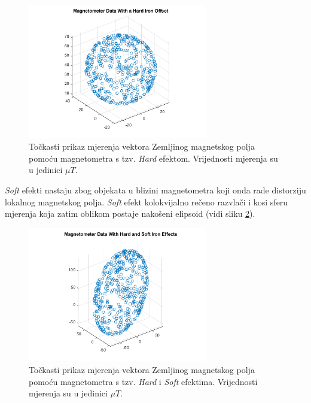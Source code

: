 \documentclass[times, utf8, diplomski, numeric]{templates/template}
\begin{document}
{{{{                \begin{figure}[htb]
                \centering
                \includegraphics[width=0.7\textwidth]{images/mag_hard.png}
                \caption{Točkasti prikaz mjerenja vektora Zemljinog magnetskog polja pomoću magnetometra s tzv. \emph{Hard} efektom. Vrijednosti mjerenja su u jedinici $\mu T$.}
                \label{fig:mag_hard}
                \end{figure}

                \emph{Soft} efekti nastaju zbog objekata u blizini magnetometra koji onda rade distorziju lokalnog magnetskog polja. \emph{Soft} efekt kolokvijalno rečeno razvlači i kosi sferu mjerenja koja zatim oblikom postaje nakošeni elipsoid (vidi sliku \ref{fig:mag_hard_soft}).

                \begin{figure}[htb]
                \centering
                \includegraphics[width=0.7\textwidth]{images/mag_hard_soft.png}
                \caption{Točkasti prikaz mjerenja vektora Zemljinog magnetskog polja pomoću magnetometra s tzv. \emph{Hard} i \emph{Soft} efektima. Vrijednosti mjerenja su u jedinici $\mu T$.}
                \label{fig:mag_hard_soft}
                \end{figure}

}}}}
\end{document}

